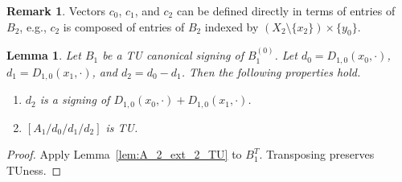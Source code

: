 \documentclass{article}
\newtheorem{lemma}{Lemma}
\theoremstyle{definition}
\newtheorem{remark}{Remark}
\begin{document}
\begin{remark}
    Vectors $c_{0}$, $c_{1}$, and $c_{2}$ can be defined directly in terms of entries of $B_{2}$, e.g., $c_{2}$ is composed of entries of $B_{2}$ indexed by $(X_{2} \setminus \{x_{2}\}) \times \{y_{0}\}$.
\end{remark}

\begin{lemma}\label{lem:A_1_ext_2_TU}
    Let $B_{1}$ be a TU canonical signing of $B_{1}^{(0)}$. Let $d_{0} = D_{1, 0} (x_{0}, \cdot)$, $d_{1} = D_{1, 0} (x_{1}, \cdot)$, and $d_{2} = d_{0} - d_{1}$. Then the following properties hold.
    \begin{enumerate}
        \item\label{item:A_1_ext_2_vec_sign} $d_{2}$ is a signing of $D_{1, 0} (x_{0}, \cdot) + D_{1, 0} (x_{1}, \cdot)$.
        \item\label{item:A_1_ext_2_TU} $[A_{1} / d_{0} / d_{1} / d_{2}]$ is TU.
    \end{enumerate}
\end{lemma}

\begin{proof}
    Apply Lemma~\ref{lem:A_2_ext_2_TU} to $B_{1}^{T}$. Transposing preserves TUness.
\end{proof}
\end{document}
